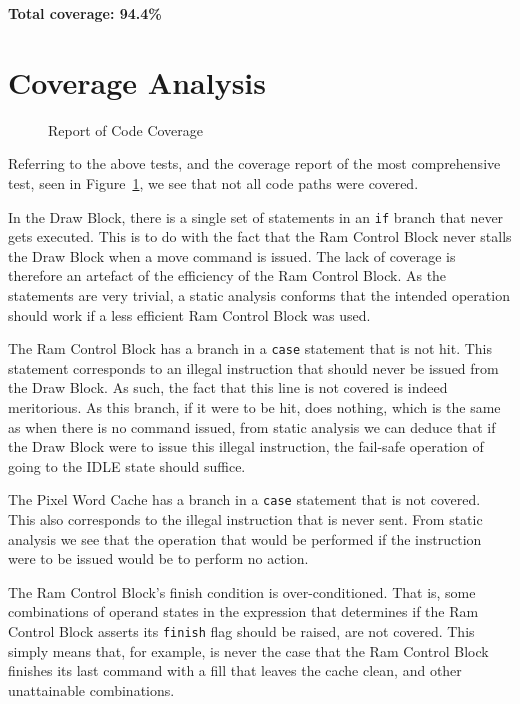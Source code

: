 \documentclass[]{article}
\begin{document}
\textbf{Total coverage: 94.4\%}



\section{Coverage Analysis} %
\label{sec:coverage_analysis}

\begin{figure}[htbp]
	\begin{center}
		
	\end{center}
	\caption{Report of Code Coverage}
	\label{fig:report_of_coverage}
\end{figure}

Referring to the above tests, and the coverage report of the most comprehensive test, seen in Figure~\ref{fig:report_of_coverage}, we see that not all code paths were covered.

In the Draw Block, there is a single set of statements in an \verb"if" branch that never gets executed. This is to do with the fact that the Ram Control Block never stalls the Draw Block when a move command is issued. The lack of coverage is therefore an artefact of the efficiency of the Ram Control Block. As the statements are very trivial, a static analysis conforms that the intended operation should work if a less efficient Ram Control Block was used.

The Ram Control Block has a branch in a \verb"case" statement that is not hit. This statement corresponds to an illegal instruction that should never be issued from the Draw Block. As such, the fact that this line is not covered is indeed meritorious. As this branch, if it were to be hit, does nothing, which is the same as when there is no command issued, from static analysis we can deduce that if the Draw Block were to issue this illegal instruction, the fail-safe operation of going to the IDLE state should suffice.

The Pixel Word Cache has a branch in a \verb"case" statement that is not covered. This also corresponds to the illegal instruction that is never sent. From static analysis we see that the operation that would be performed if the instruction were to be issued would be to perform no action.

The Ram Control Block's finish condition is over-conditioned. That is, some combinations of operand states in the expression that determines if the Ram Control Block asserts its \verb"finish" flag should be raised, are not covered. This simply means that, for example, is never the case that the Ram Control Block finishes its last command with a fill that leaves the cache clean, and other unattainable combinations.
\end{document}
